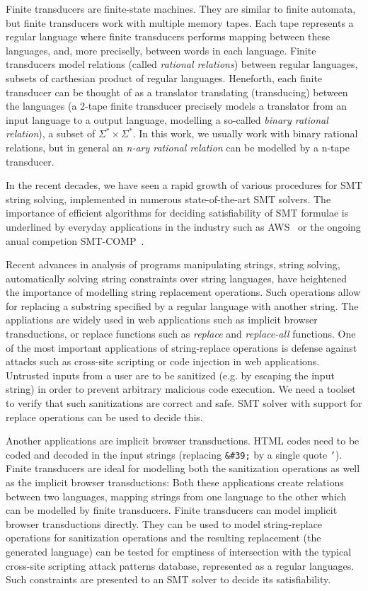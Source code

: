 Finite transducers are finite-state machines.
They are similar to finite automata, but finite transducers work with multiple memory tapes.
Each tape represents a regular language where finite transducers performs mapping between these languages, and, more preciselly, between words in each language.
Finite transducers model relations (called \emph{rational relations}) between regular languages, subsets of carthesian product of regular languages.
Heneforth, each finite transducer can be thought of as a translator translating (transducing) between the languages (a 2-tape finite transducer precisely models a translator from an input language to a output language, modelling a so-called \emph{binary rational relation}), a subset of $\Sigma^* \times \Sigma^*$.
In this work, we usually work with binary rational relations, but in general an \emph{n-ary rational relation} can be modelled by a n-tape transducer.

In the recent decades, we have seen a rapid growth of  various procedures for SMT string solving, implemented in numerous state-of-the-art SMT solvers.
The importance of efficient algorithms for deciding satisfiability of SMT formulae is underlined by everyday applications in the industry such as AWS~\cite{Rungta2022} or the ongoing anual competion SMT-COMP~\cite{smt_comp}.

Recent advances in analysis of programs manipulating strings, string solving, automatically solving string constraints over string languages, have heightened the importance of modelling string replacement operations.
Such operations allow for replacing a substring specified by a regular language with another string.
The appliations are widely used in web applications such as implicit browser transductions, or replace functions such as \emph{replace} and \emph{replace-all} functions.
One of the most important applications of string-replace operations is defense against attacks such as cross-site scripting or code injection in web applications.
Untrusted inputs from a user are to be sanitized (e.g. by escaping the input string) in order to prevent arbitrary malicious code execution.
We need a toolset to verify that such sanitizations are correct and safe.
SMT solver with support for replace operations can be used to decide this.

Another applications are implicit browser transductions.
HTML codes need to be coded and decoded in the input strings (replacing \texttt{\&\#39;} by a single quote \texttt{'}).
Finite transducers are ideal for modelling both the sanitization operations as well as the implicit browser transductions:
Both these applications create relations between two languages, mapping strings from one language to the other which can be modelled by finite transducers.
Finite transducers can model implicit browser transductions directly.
They can be used to model string-replace operations for sanitization operations and the resulting replacement (the generated language) can be tested for emptiness of intersection with the typical cross-site scripting attack patterns database, represented as a regular languages.
Such constraints are presented to an SMT solver to decide its satisfiability.

